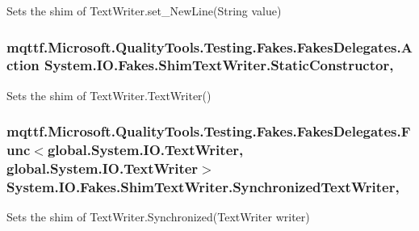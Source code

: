 Sets the shim of Text\-Writer.\-set\-\_\-\-New\-Line(\-String value)

\hypertarget{class_system_1_1_i_o_1_1_fakes_1_1_shim_text_writer_a5444e80f0b9289b9c1642eb51a899c84}{
\subsubsection[{Static\-Constructor}]{\setlength{\rightskip}{0pt plus 5cm}mqttf.\-Microsoft.\-Quality\-Tools.\-Testing.\-Fakes.\-Fakes\-Delegates.\-Action System.\-I\-O.\-Fakes.\-Shim\-Text\-Writer.\-Static\-Constructor\hspace{0.3cm}{\ttfamily [static]}, {\ttfamily [set]}}}\label{class_system_1_1_i_o_1_1_fakes_1_1_shim_text_writer_a5444e80f0b9289b9c1642eb51a899c84}


Sets the shim of Text\-Writer.\-Text\-Writer()

\hypertarget{class_system_1_1_i_o_1_1_fakes_1_1_shim_text_writer_a8cdc94101aae81817dec6efff138c8c0}{
\subsubsection[{Synchronized\-Text\-Writer}]{\setlength{\rightskip}{0pt plus 5cm}mqttf.\-Microsoft.\-Quality\-Tools.\-Testing.\-Fakes.\-Fakes\-Delegates.\-Func$<$global.\-System.\-I\-O.\-Text\-Writer, global.\-System.\-I\-O.\-Text\-Writer$>$ System.\-I\-O.\-Fakes.\-Shim\-Text\-Writer.\-Synchronized\-Text\-Writer\hspace{0.3cm}{\ttfamily [static]}, {\ttfamily [set]}}}\label{class_system_1_1_i_o_1_1_fakes_1_1_shim_text_writer_a8cdc94101aae81817dec6efff138c8c0}


Sets the shim of Text\-Writer.\-Synchronized(\-Text\-Writer writer)

